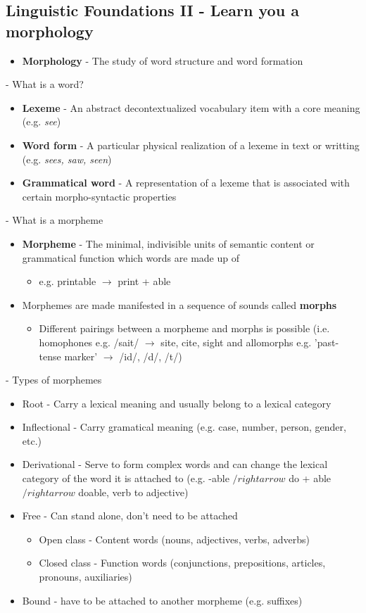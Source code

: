 \documentclass[11pt]{article}
\begin{document}
\subsection{Linguistic Foundations II - Learn you a morphology}
\begin{itemize}
 \item \textbf{Morphology} - The study of word structure and word formation
\end{itemize}

- What is a word?
\begin{itemize}
 \item \textbf{Lexeme} - An abstract decontextualized vocabulary item with a core meaning (e.g. {\it see})
 \item \textbf{Word form} - A particular physical realization of a lexeme in text or writting (e.g. {\it sees, saw, seen}) 
 \item \textbf{Grammatical word} - A representation of a lexeme that is associated with certain morpho-syntactic properties
\end{itemize}
- What is a morpheme
\begin{itemize}
 \item {\bf Morpheme} - The minimal, indivisible units of semantic content or grammatical function which words are made up of
  \begin{itemize}
   \item e.g. printable $\rightarrow$ print + able
  \end{itemize}
  \item Morphemes are made manifested in a sequence of sounds called {\bf morphs}
  \begin{itemize}
    \item Different pairings between a morpheme and morphs is possible (i.e. homophones e.g. /sait/ $\rightarrow$ site, cite, sight and allomorphs e.g. 'past-tense marker' $\rightarrow$ /id/, /d/, /t/)  
  \end{itemize}
\end{itemize}
- Types of morphemes
\begin{itemize}
 \item Root - Carry a lexical meaning and usually belong to a lexical category
 \item Inflectional - Carry gramatical meaning (e.g. case, number, person, gender, etc.)
 \item Derivational - Serve to form complex words and can change the lexical category of the word it is attached to (e.g. -able $/rightarrow$ do + able $/rightarrow$ doable, verb to adjective)
 \item Free - Can stand alone, don't need to be attached
  \begin{itemize}
    \item Open class - Content words (nouns, adjectives, verbs, adverbs)
    \item Closed class - Function words  (conjunctions, prepositions, articles, pronouns, auxiliaries)
  \end{itemize}
 \item Bound - have to be attached to another morpheme (e.g. suffixes)
\end{itemize}
\end{document}
